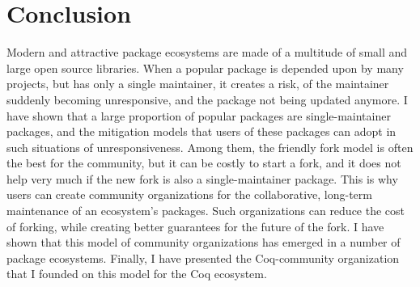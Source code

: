 \section{Conclusion}

Modern and attractive package ecosystems are made of a multitude of small and large open source libraries.
When a popular package is depended upon by many projects, but has only a single maintainer, it creates a risk, of the maintainer suddenly becoming unresponsive, and the package not being updated anymore.
I have shown that a large proportion of popular packages are single-maintainer packages, and the mitigation models that users of these packages can adopt in such situations of unresponsiveness.
Among them, the friendly fork model is often the best for the community, but it can be costly to start a fork, and it does not help very much if the new fork is also a single-maintainer package.
This is why users can create community organizations for the collaborative, long-term maintenance of an ecosystem's packages.
Such organizations can reduce the cost of forking, while creating better guarantees for the future of the fork.
I have shown that this model of community organizations has emerged in a number of package ecosystems.
Finally, I have presented the Coq-community organization that I founded on this model for the Coq ecosystem.
